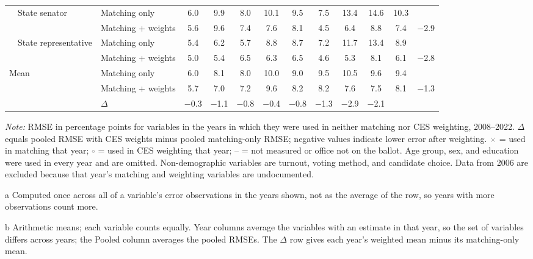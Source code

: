 \begin{table}[!htbp]
{\begin{threeparttable}
\begin{tabular}{llcccccccccc}
\addlinespace[0.1em]
~~State senator & Matching only & 6.0 & 9.9 & 8.0 & 10.1 & 9.5 & 7.5 & 13.4 & 14.6 & 10.3 & \\
 & Matching + weights & 5.6 & 9.6 & 7.4 & 7.6 & 8.1 & 4.5 & 6.4 & 8.8 & 7.4 & $-$2.9 \\
\addlinespace[0.1em]
~~State representative & Matching only & 5.4 & 6.2 & 5.7 & 8.8 & 8.7 & 7.2 & 11.7 & 13.4 & 8.9 & \\
 & Matching + weights & 5.0 & 5.4 & 6.5 & 6.3 & 6.5 & 4.6 & 5.3 & 8.1 & 6.1 & $-$2.8 \\
\midrule
Mean\tnote{b} & Matching only & 6.0 & 8.1 & 8.0 & 10.0 & 9.0 & 9.5 & 10.5 & 9.6 & 9.4 & \\
 & Matching + weights & 5.7 & 7.0 & 7.2 & 9.6 & 8.2 & 8.2 & 7.6 & 7.5 & 8.1 & $-$1.3 \\
 & $\Delta$ & $-$0.3 & $-$1.1 & $-$0.8 & $-$0.4 & $-$0.8 & $-$1.3 & $-$2.9 & $-$2.1 & & \\
\bottomrule
\end{tabular}
\begin{tablenotes}
\footnotesize
\item \textit{Note:} RMSE in percentage points for variables in the years in which they were used in neither matching nor CES weighting, 2008--2022. $\Delta$ equals pooled RMSE with CES weights minus pooled matching-only RMSE; negative values indicate lower error after weighting. \textcolor{gray}{$\times$} = used in matching that year; \textcolor{gray}{$\circ$} = used in CES weighting that year; \textcolor{gray}{--} = not measured or office not on the ballot. Age group, sex, and education were used in every year and are omitted. Non-demographic variables are turnout, voting method, and candidate choice. Data from 2006 are excluded because that year's matching and weighting variables are undocumented.
\item[a] Computed once across all of a variable's error observations in the years shown, not as the average of the row, so years with more observations count more.
\item[b] Arithmetic means; each variable counts equally. Year columns average the variables with an estimate in that year, so the set of variables differs across years; the Pooled column averages the pooled RMSEs. The $\Delta$ row gives each year's weighted mean minus its matching-only mean.
\end{tablenotes}
\end{threeparttable}%
}
\end{table}